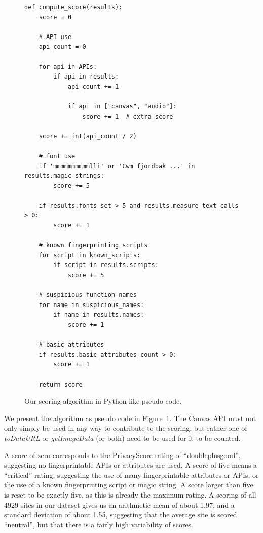 \documentclass[
    fontsize=12pt,
    headings=small,
    parskip=half,
    bibliography=totoc,
    numbers=noenddot,
    open=any
    ]{scrreprt}
\begin{document}
\begin{figure}
\label{code:scoring_algorithm}
    \begin{verbatim}
def compute_score(results):
    score = 0

    # API use
    api_count = 0

    for api in APIs:
        if api in results:
            api_count += 1
            
            if api in ["canvas", "audio"]:
                score += 1  # extra score

    score += int(api_count / 2)

    # font use
    if 'mmmmmmmmmmlli' or 'Cwm fjordbak ...' in results.magic_strings:
        score += 5

    if results.fonts_set > 5 and results.measure_text_calls > 0:
        score += 1

    # known fingerprinting scripts
    for script in known_scripts:
        if script in results.scripts:
            score += 5

    # suspicious function names
    for name in suspicious_names:
        if name in results.names:
            score += 1

    # basic attributes
    if results.basic_attributes_count > 0:
        score += 1

    return score
\end{verbatim}
\caption{Our scoring algorithm in Python-like pseudo code.}
\end{figure}

We present the algorithm as pseudo code in Figure~\ref{code:scoring_algorithm}.
The Canvas API must not only simply be used in any way to contribute
to the scoring, but rather one of \textit{toDataURL} or \textit{getImageData} (or both) need to be used
for it to be counted.

A score of zero corresponds to the PrivacyScore rating of ``doubleplusgood'', suggesting
no fingerprintable APIs or attributes are used. A score of five means a ``critical'' rating,
suggesting the use of many fingerprintable attributes or APIs, or the use of a known fingerprinting
script or magic string. A score larger than five is reset to be exactly five, as this is already
the maximum rating.
A scoring of all 4929 sites in our dataset gives us an arithmetic mean of
about 1.97, and a standard deviation of about 1.55, suggesting that the average site
is scored ``neutral'', but that there is a fairly high variability of scores.
\end{document}
